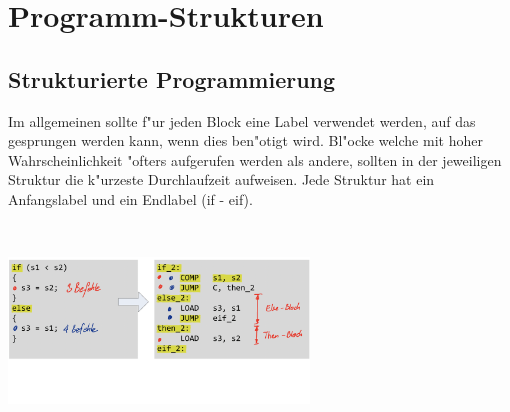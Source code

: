 \section{Programm-Strukturen}
\subsection{Strukturierte Programmierung}
\begin{minipage}{10cm}
	\vspace{-8ex}
	Im allgemeinen sollte f"ur jeden Block eine Label verwendet werden, auf das gesprungen werden kann, wenn dies ben"otigt wird. Bl"ocke welche mit hoher Wahrscheinlichkeit "ofters aufgerufen werden als andere, sollten in der jeweiligen Struktur die k"urzeste Durchlaufzeit aufweisen. Jede Struktur hat ein Anfangslabel und ein Endlabel (if - eif).
\end{minipage}
%
\begin{minipage}{0.5cm}
	\ \
\end{minipage}
%
\begin{minipage}{8cm}
	\includegraphics[width=8cm]{pics/Strukturierte_Programmierung}
\end{minipage}

